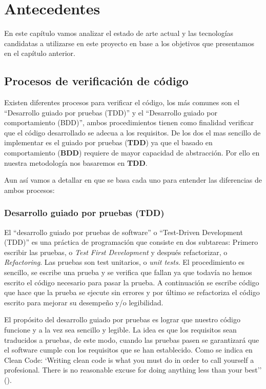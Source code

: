\chapter{Antecedentes}

En este capítulo vamos analizar el estado de arte actual y las tecnologías candidatas a utilizarse en este proyecto en base a los objetivos que presentamos en el capítulo anterior.


\section {Procesos de verificación de código}

Existen diferentes procesos para verificar el código, los más comunes son el ``Desarrollo guiado por pruebas (TDD)'' y el ``Desarrollo guiado por comportamiento (BDD)'', ambos procedimientos tienen como finalidad verificar que el código desarrollado se adecua a los requisitos. De los dos el mas sencillo de implementar es el guiado por pruebas (\textbf{TDD}) ya que el basado en comportamiento (\textbf{BDD}) requiere de mayor capacidad de abstracción. Por ello en nuestra metodología nos basaremos en \textbf{TDD}.

\bigskip
Aun así vamos a detallar en que se basa cada uno para entender las diferencias de ambos procesos:

\subsection {Desarrollo guiado por pruebas (TDD)}

El ``desarrollo guiado por pruebas de software'' o ``Test-Driven Development (TDD)'' es una práctica de programación que consiste en dos subtareas: Primero escribir las pruebas, o \textit{Test First Development} y después refactorizar, o \textit{Refactoring}. Las pruebas son test unitarios, o \textit{unit tests}. El procedimiento es sencillo, se escribe una prueba y se verifica que fallan ya que todavía no hemos escrito el código necesario para pasar la prueba. A continuación se escribe código que hace que la prueba se ejecute sin errores y por último se refactoriza el código escrito para mejorar su desempeño y/o legibilidad.

\bigskip
El propósito del desarrollo guiado por pruebas es lograr que nuestro código funcione y a la vez sea sencillo y legible. La idea es que los requisitos sean traducidos a pruebas, de este modo, cuando las pruebas pasen se garantizará que el software cumple con los requisitos que se han establecido. Como se indica en Clean Code: `Writing clean code is what you must do in order to call yourself a profesional. There is no reasonable excuse for doing anything less than your best'' (\cite{martin_clean_2009}).

